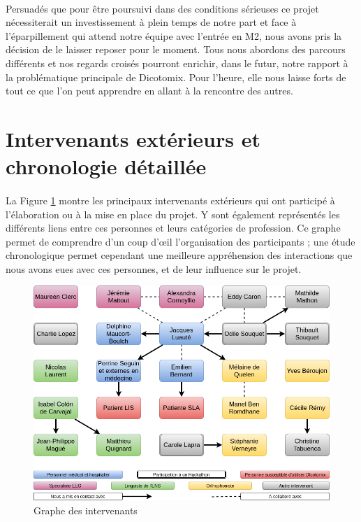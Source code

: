 \documentclass[11pt,a4paper]{article}
\theoremstyle{plain}
\theoremstyle{definition}
\begin{document}
\paragraph{} Persuadés que pour être poursuivi dans des conditions sérieuses ce projet nécessiterait un investissement à plein temps de notre part et face à l'éparpillement qui attend notre équipe avec l'entrée 
en M2, nous avons pris la décision de le laisser reposer pour le moment. Tous nous abordons des parcours différents et nos regards croisés pourront enrichir, dans le futur, notre rapport 
à la problématique principale de Dicotomix. Pour l'heure, elle nous laisse forts de tout ce que l'on peut apprendre en allant à la rencontre des autres.

\newpage
\appendix
\section{Intervenants extérieurs et chronologie détaillée}
\paragraph{} La Figure \ref{grapheIntervenants} montre les principaux intervenants extérieurs qui ont participé à l'élaboration ou à la mise en place du projet. Y sont également représentés les différents liens entre ces personnes et leurs catégories de profession. Ce graphe permet de comprendre d'un coup d'\oe il l'organisation des participants ; une étude chronologique permet cependant une meilleure appréhension des interactions que nous avons eues avec ces personnes, et de leur influence sur le projet.
\begin{figure}[h!]
\centering \includegraphics[width=16.4cm]{images/grapheIntervenants.png}
\caption{Graphe des intervenants}
\label{grapheIntervenants}
\end{figure}
\end{document}
